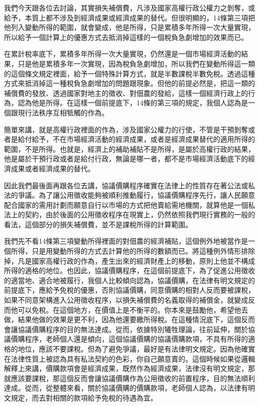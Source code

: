 \documentclass[]{ctexbook}
\begin{document}
我們今天跟各位去討論，其實損失補償費，凡涉及國家高權行政公權力之剝奪，或給予，本質上都不涉及到經濟成果或經濟成果的替代。但很明顯的，14條第三項把他列入變動所得的範圍，就會變成，他是所得，只是累積多年所得一次大量實現，所以給予一個計算上的優惠方式去抵消掉這樣的一個稅負急劇增加的效果而已。

在累計稅率底下，累積多年所得一次大量實現，仍然還是一個市場經濟活動的結果，只是他是累積多年一次實現，因為稅負急劇增加，所以我們在變動所得這一類的這個條文規定裡面，給予一個特殊計算方式，就是半數課稅半數免稅。透過這種方式來抵消掉這一種稅負急劇增加的問題跟現象。但他的前提必然是，把這一類的補償費的發放、透過國家對地主的徵收、對佃農的發給，這樣一個經濟行政上的行為，認為他是所得。在這樣一個前提底下，14條的第三項的規定，我個人認為是一個跟現行法秩序互相牴觸的作為。

簡單來講，就是高權行政裡面的作為，涉及國家公權力的行使，不管是干預剝奪或者是給付給予，不在市場經濟活動的經濟成果，或者是經濟成果替代的適用所得的範圍，不是所得。也就是，經濟上的補助補貼不是所得，是屬於高權行政的結果，他是屬於干預行政或者是給付行政，無論是哪一者，都不是市場經濟活動底下的經濟成果或者經濟成果的替代。

因此我們最後面再跟各位去講，協議價購程序確實在法律上的性質存在著公法或私法的爭議。為了讓公用徵收能夠被順利推動履行，協議價購程序先行，讓人民願意配合國家的需用計劃而願意自行以市場的方式把他賣給需地機關，就算他是一個私法上的契約，由於後面的公用徵收程序在現實上，仍然依照我們現行實務的一般的看法，這個部分的損失補償費，並不是課稅所得的計算範圍。

我們先不看14條第三項變動所得裡面的對佃農的經濟補貼，這個例外地被當作是一個所得，只是用變動所得的方式去計算他的所得的數額而已。將這種例外情形排除掉，凡是國家高權行政的作為，產生出來的經濟財產上的移動，原則上他並不構成所得的適格的地位。也因此，協議價購程序，在這個前提底下，為了促進公用徵收的適當地、適合地被履行，我個人比較傾向認為，協議價購，在法律有明文規定的前提底下，應給予免稅的優惠，否則協議價購，同意價購的相對人反而要被課稅，如果不同意架構進入公用徵收程序，以損失補償費的名義取得的補償金，就變成反而他可以免稅。在這個地方，在價值上是不衡平的。你本來是鼓勵他，希望他去做，結果他做的效果是更不利，因為他還要繳所得稅。在這種情況底下，這個反而會讓協議價購程序的目的無法達成。從而，依據特別犧牲理論，往前延伸，關於協議價購程序，老師個人還是傾向，這個協議價購的協議價購款項，不具有所得的適格的地位，應該不要課稅。但為了避免爭議，最好是有法律明文規定。因為他確實在法律性質上被認為具有私法契約的色彩，你自己願意賣的。這個時候如果從邏輯解釋上來講，價購款項會是經濟成果，既然作為經濟成果，法律沒有明文規定，那就應該要課稅，那這個反而會讓協議價購作為公用徵收的前置程序，目的無法順利達成。從而，從整體來看，關於協議價購的價購款項，老師個人認為，以法律有明文規定，而去對相關的款項給予免稅的待遇為宜。
\end{document}
